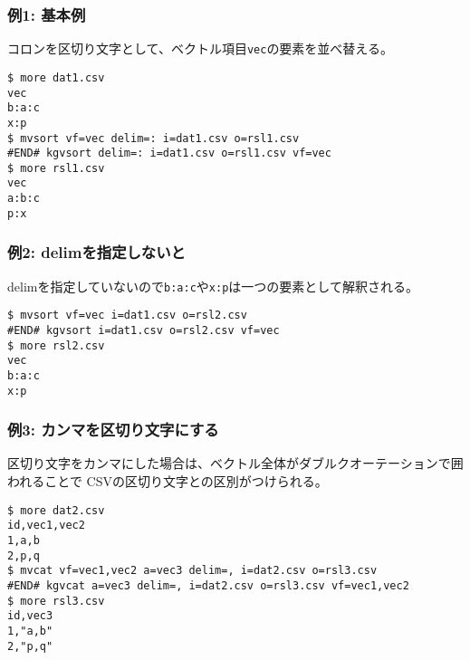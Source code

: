 \subsubsection*{例1: 基本例}

コロンを区切り文字として、ベクトル項目\verb|vec|の要素を並べ替える。


\begin{Verbatim}[baselinestretch=0.7,frame=single]
$ more dat1.csv
vec
b:a:c
x:p
$ mvsort vf=vec delim=: i=dat1.csv o=rsl1.csv
#END# kgvsort delim=: i=dat1.csv o=rsl1.csv vf=vec
$ more rsl1.csv
vec
a:b:c
p:x
\end{Verbatim}
\subsubsection*{例2: delimを指定しないと}

delimを指定していないので\verb|b:a:c|や\verb|x:p|は一つの要素として解釈される。


\begin{Verbatim}[baselinestretch=0.7,frame=single]
$ mvsort vf=vec i=dat1.csv o=rsl2.csv
#END# kgvsort i=dat1.csv o=rsl2.csv vf=vec
$ more rsl2.csv
vec
b:a:c
x:p
\end{Verbatim}
\subsubsection*{例3: カンマを区切り文字にする}

区切り文字をカンマにした場合は、ベクトル全体がダブルクオーテーションで囲われることで
CSVの区切り文字との区別がつけられる。


\begin{Verbatim}[baselinestretch=0.7,frame=single]
$ more dat2.csv
id,vec1,vec2
1,a,b
2,p,q
$ mvcat vf=vec1,vec2 a=vec3 delim=, i=dat2.csv o=rsl3.csv
#END# kgvcat a=vec3 delim=, i=dat2.csv o=rsl3.csv vf=vec1,vec2
$ more rsl3.csv
id,vec3
1,"a,b"
2,"p,q"
\end{Verbatim}
